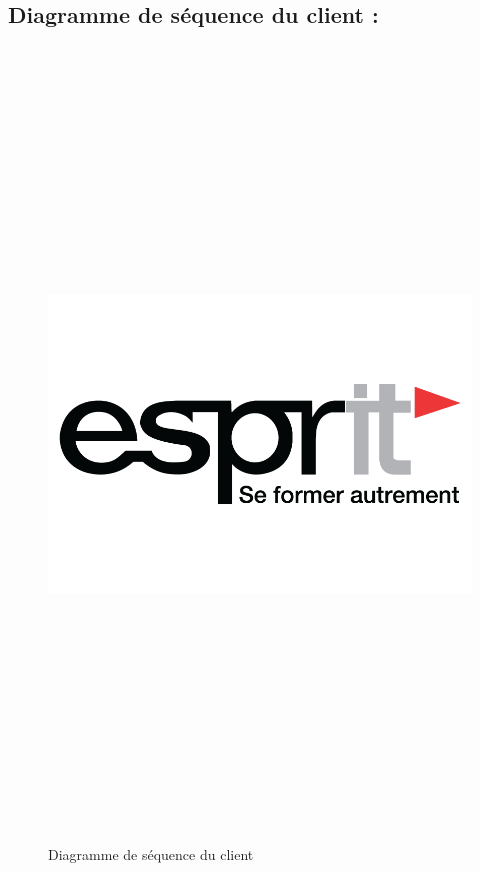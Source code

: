 \subsection{Diagramme de séquence du client :}
\begin{figure}[h!]
	\centering
	\includegraphics[width=15.5cm,height=21cm]{resources/images/logo.png}
	\caption{Diagramme de séquence du client}
	\label{imag1}
\end{figure}

